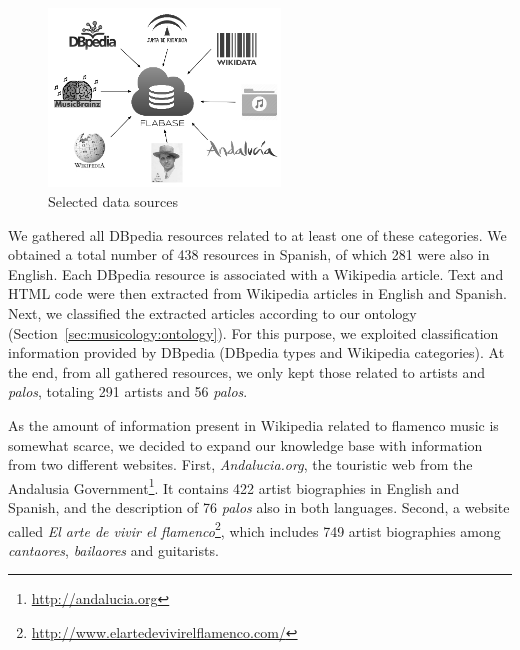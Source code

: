 \begin{figure}
	\centering
	\includegraphics[width=0.55\textwidth]{ch05_musicology_pics/datasources_bn.png}
	\caption{Selected data sources \label{fig:musicology:datasources}}
\end{figure}

We gathered all DBpedia resources related to at least one of these categories. We obtained a total number of 438 resources in Spanish, of which 281 were also in English. Each DBpedia resource is associated with a Wikipedia article. Text and HTML code were then extracted from Wikipedia articles in English and Spanish. %
Next, we classified the extracted articles according to our ontology (Section~\ref{sec:musicology:ontology}). For this purpose, we exploited classification information provided by DBpedia (DBpedia types and Wikipedia categories). At the end, from all gathered resources, we only kept those related to artists and \textit{palos}, totaling  291 artists and 56 \textit{palos}.

As the amount of information present in Wikipedia related to flamenco music is somewhat scarce, we decided to expand our knowledge base with information from two different websites. First, \textit{Andalucia.org}, the touristic web from the Andalusia Government\footnote{\url{http://andalucia.org}}. It contains 422 artist biographies in English and Spanish, and the description of 76 \textit{palos} also in both languages. Second, a website called \textit{El arte de vivir el flamenco}\footnote{\url{http://www.elartedevivirelflamenco.com/}}, which includes 749 artist biographies among \textit{cantaores}, \textit{bailaores} and guitarists. %

